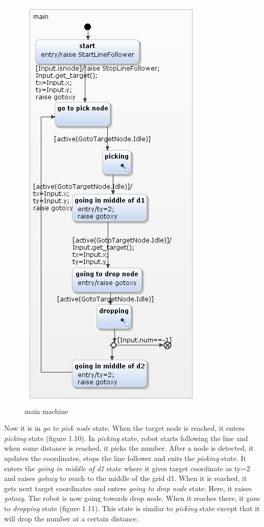 \documentclass[a4paper,12pt,oneside]{book}
\begin{document}
\begin{itemize}
\begin{figure}[]
	\includegraphics[scale=.8]{main.png}
	\caption{main machine}
\end{figure} 
Now it is in \textit{go to pick node} state. When the target node is reached, it enters \textit{picking} state (figure 1.10). In \textit{picking} state, robot starts following the line and when some distance is reached, it picks the number. After a node is detected, it updates the coordinates, stops the line follower and exits the \textit{picking} state. It enters the \textit{going in middle of d1} state where it gives target coordinate as ty=2 and raises \textit{gotoxy} to reach to the middle of the grid d1. When it is reached, it gets next target coordinates and enters \textit{going to drop node} state. Here, it raises \textit{gotoxy}. The robot is now going towards drop node. When it reaches there, it goes to \textit{dropping} state (figure 1.11). This state is similar to \textit{picking} state except that it will drop the number at a certain distance. 

\end{itemize}
\end{document}
